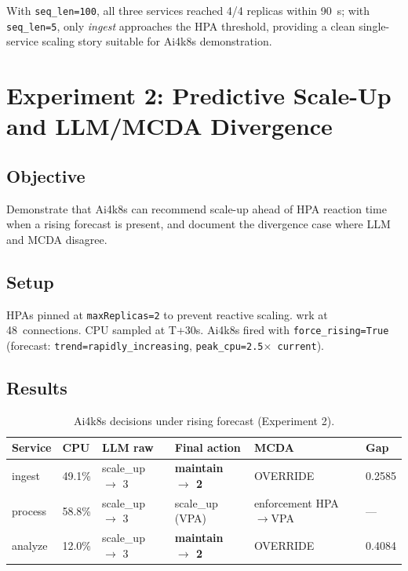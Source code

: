 With \texttt{seq\_len=100}, all three services reached 4/4 replicas within 90~s;
with \texttt{seq\_len=5}, only \textit{ingest} approaches the HPA threshold,
providing a clean single-service scaling story suitable for Ai4k8s demonstration.

\section{Experiment 2: Predictive Scale-Up and LLM/MCDA Divergence}
\label{sec:exp2}

\subsection{Objective}
Demonstrate that Ai4k8s can recommend scale-up ahead of HPA reaction time
when a rising forecast is present, and document the divergence case where
LLM and MCDA disagree.

\subsection{Setup}
HPAs pinned at \texttt{maxReplicas=2} to prevent reactive scaling. wrk at
48~connections. CPU sampled at T+30s. Ai4k8s fired with
\texttt{force\_rising=True} (forecast: \texttt{trend=rapidly\_increasing},
\texttt{peak\_cpu=2.5$\times$ current}).

\subsection{Results}

\begin{table}[h]
  \centering
  \caption{Ai4k8s decisions under rising forecast (Experiment 2).}
  \label{tab:exp2}
  \small
  \begin{tabular}{llllll}
    \toprule
    Service & CPU & LLM raw & Final action & MCDA & Gap \\
    \midrule
    ingest  & 49.1\% & scale\_up $\to$ 3 & \textbf{maintain $\to$ 2} & OVERRIDE & 0.2585 \\
    process & 58.8\% & scale\_up $\to$ 3 & scale\_up (VPA) & enforcement HPA$\to$VPA & --- \\
    analyze & 12.0\% & scale\_up $\to$ 3 & \textbf{maintain $\to$ 2} & OVERRIDE & 0.4084 \\
    \bottomrule
  \end{tabular}
\end{table}


